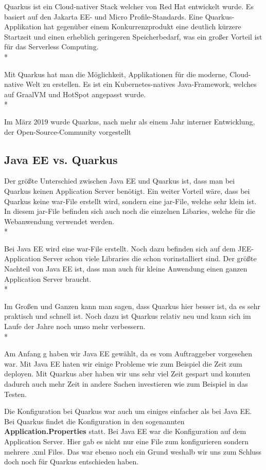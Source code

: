 Quarkus ist ein Cloud-nativer Stack welcher von Red Hat entwickelt wurde. Es basiert auf den Jakarta EE- und Micro Profile-Standards. 
Eine Quarkus-Applikation hat gegenüber einem Konkurrenzprodukt eine deutlich kürzere Startzeit und einen erheblich geringeren Speicherbedarf, was ein großer Vorteil ist für das Serverless Computing.  \cite{Quarkus} \\*

Mit Quarkus hat man die Möglichkeit, Applikationen für die moderne, Cloud-native Welt zu erstellen. 
Es ist ein Kubernetes-natives Java-Framework, welches auf GraalVM und HotSpot angepasst wurde. \\*   

Im März 2019 wurde Quarkus, nach mehr als einem Jahr interner Entwicklung, der Open-Source-Community vorgestellt

\subsection{Java EE vs. Quarkus}
\author{David Ignjatovic} 

Der größte Unterschied zwischen Java EE und Quarkus ist, dass man bei Quarkus keinen Application Server benötigt. 
Ein weiter Vorteil wäre, dass bei Quarkus keine war-File erstellt wird, sondern eine jar-File, welche sehr klein ist. 
In diesem jar-File befinden sich auch noch die einzelnen Libaries, welche für die Webanwendung verwendet werden. \\*

Bei Java EE wird eine war-File erstellt. Noch dazu befinden sich auf dem JEE-Application Server schon viele Libraries die schon vorinstalliert sind. 
Der größte Nachteil von Java EE ist, dass man auch für kleine Anwendung einen ganzen Application Server braucht. \\*

Im Großen und Ganzen kann man sagen, dass Quarkus hier besser ist, da es sehr praktisch und schnell ist. 
Noch dazu ist Quarkus relativ neu und kann sich im Laufe der Jahre noch umso mehr verbessern. \\*

Am Anfang g haben wir Java EE gewählt, da es vom Auftraggeber vorgesehen war. Mit Java EE haten wir einige Probleme wie zum Beispiel die Zeit zum deployen. 
Mit Quarkus aber haben wir uns sehr viel Zeit gespart und konnten dadurch auch mehr Zeit in andere Sachen investieren wie zum Beispiel in das Testen.

Die Konfiguration bei Quarkus war auch um einiges einfacher als bei Java EE. Bei Quarkus findet die Konfiguration in den sogenannten \textbf{Application.Properties} statt.
Bei Java EE war die Konfiguration auf dem Application Server. Hier gab es nicht nur eine File zum konfigurieren sondern mehrere .xml Files. 
Das war ebenso noch ein Grund weshalb wir uns zum Schluss doch noch für Quarkus entschieden haben.


